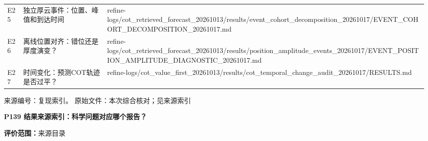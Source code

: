 \documentclass[UTF8,a4paper,landscape,10pt]{ctexart}
\begin{document}
\begin{center}
\begin{adjustbox}{max totalheight=0.58\textheight,max width=\linewidth}
\begin{minipage}{\linewidth}
\begin{tabularx}{\linewidth}{>{\hsize=0.3000\hsize\raggedright\arraybackslash}X>{\hsize=0.9000\hsize\raggedright\arraybackslash}X>{\hsize=1.8000\hsize\raggedright\arraybackslash}X}
E25 & 独立厚云事件：位置、峰值和到达时间 & refine-logs/\allowbreak{}cot\_\allowbreak{}retrieved\_\allowbreak{}forecast\_\allowbreak{}20261013/\allowbreak{}results/\allowbreak{}event\_\allowbreak{}cohort\_\allowbreak{}decomposition\_\allowbreak{}20261017/\allowbreak{}EVENT\_\allowbreak{}COHORT\_\allowbreak{}DECOMPOSITION\_\allowbreak{}20261017.md \\
E26 & 离线位置对齐：错位还是厚度演变？ & refine-logs/\allowbreak{}cot\_\allowbreak{}retrieved\_\allowbreak{}forecast\_\allowbreak{}20261013/\allowbreak{}results/\allowbreak{}position\_\allowbreak{}amplitude\_\allowbreak{}events\_\allowbreak{}20261017/\allowbreak{}EVENT\_\allowbreak{}POSITION\_\allowbreak{}AMPLITUDE\_\allowbreak{}DIAGNOSTIC\_\allowbreak{}20261017.md \\
E27 & 时间变化：预测COT轨迹是否过平？ & refine-logs/\allowbreak{}cot\_\allowbreak{}value\_\allowbreak{}first\_\allowbreak{}20261013/\allowbreak{}results/\allowbreak{}cot\_\allowbreak{}temporal\_\allowbreak{}change\_\allowbreak{}audit\_\allowbreak{}20261017/\allowbreak{}RESULTS.md \\
\bottomrule\end{tabularx}\end{minipage}\end{adjustbox}\end{center}
\vfill{\scriptsize\color{muted} 来源编号：复现索引。 原始文件：本次综合核对；见来源索引}\par
\clearpage
{\large\bfseries\color{ink} P139  结果来源索引：科学问题对应哪个报告？}\par
{}\par
{\small\color{muted}\textbf{评价范围：}来源目录}\par\vspace{3mm}
\end{document}
